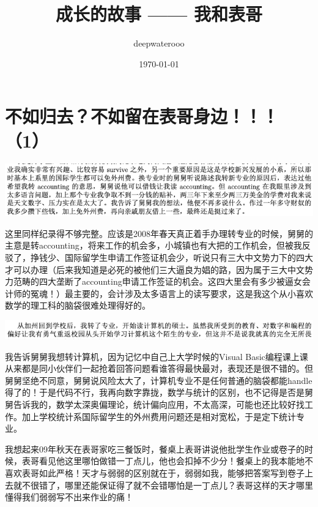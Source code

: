 \documentclass[9pt, b5paper]{article}
\author{deepwaterooo}
\date{\today}
\title{成长的故事 —— 我和表哥}
\begin{document}
\maketitle
\tableofcontents


\section{不如归去？不如留在表哥身边！！！（1）}
\label{sec:org0c79867}

\begin{center}
\includegraphics[width=.9\linewidth]{./pic/backups_plans_20210414_161250.png}
\end{center}

这里同样纪录得不够完整。应该是2008年春天真正着手办理转专业的时候，舅舅的主意是转accounting，将来工作的机会多，小城镇也有大把的工作机会，但被我反驳了，挣钱少、国际留学生申请工作签证机会少，听说只有三大中文势力下的四大才可以办理（后来我知道是必死的被他们三大逼良为娼的路，因为属于三大中文势力范畴的四大垄断了accounting申请工作签证的机会。这四大里会有多少被逼女会计师的冤魂！）最主要的，会计涉及太多语言上的读写要求，这是我这个从小喜欢数学的理工科的脑袋很难处理得好的。

\begin{center}
\includegraphics[width=.9\linewidth]{./pic/backups_plans_20210414_171951.png}
\end{center}

我告诉舅舅我想转计算机，因为记忆中自己上大学时候的Visual Basic编程课上课从来都是同小伙伴们一起抢着回答问题看谁答得最快最对，表现还是很不错的。但舅舅坚绝不同意，舅舅说风险太大了，计算机专业不是任何普通的脑袋都能handle得了的！于是代码不行，我再向数字靠拢，数学与统计的区别，也不记得是否是舅舅告诉我的，数学太深奥偏理论，统计偏向应用，不太高深，可能也还比较好找工作。加上学校统计系国际留学生的外州费用问题还是相对宽松，于是定下统计专业。 

我想起来09年秋天在表哥家吃三餐饭时，餐桌上表哥讲说他批学生作业或卷子的时候，表哥看见他这里哪怕做错一丁点儿，他也会扣掉不少分！餐桌上的我本能地不喜欢表哥如此严格！天才与弱弱的区别就在于，弱弱如我，能够把答案写到卷子上去就不很错了，哪里还能保证得了就不会错哪怕是一丁点儿？表哥这样的天才哪里懂得我们弱弱写不出来作业的痛！
\end{document}
